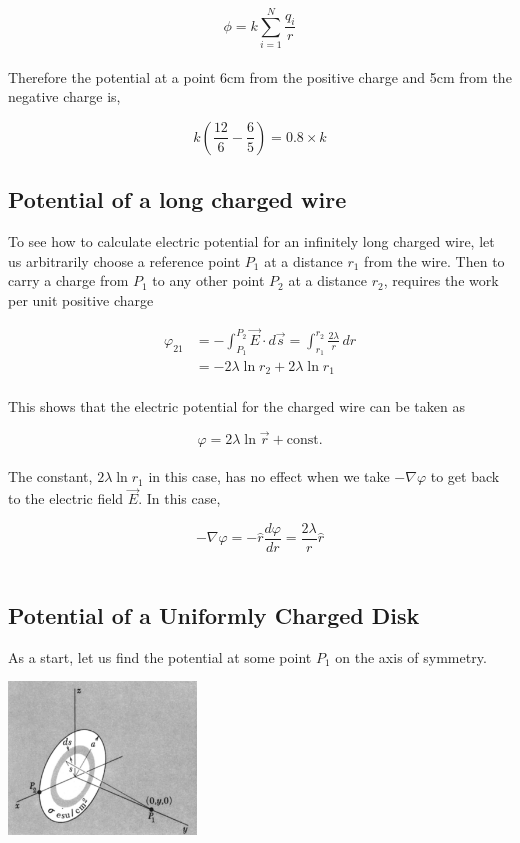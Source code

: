 \documentclass[svgnames]{article}
\begin{document}
\[ \phi = k\sum_{i=1}^N \frac{q_i}{r} \] \\

Therefore the potential at a point 6cm from the positive charge and 5cm from the negative charge is, 

\[
k (\frac{12}{6} - \frac{6}{5}) = 0.8 \times k
\]

\subsection{Potential of a long charged wire} 

To see how to calculate electric potential for an infinitely long charged wire, let us arbitrarily choose a reference point $P_1$ at a distance $r_1$ from the wire. Then to carry a charge from $P_1$ to any other point $P_2$ at a distance $r_2$, requires the work per unit positive charge 

\begin{align*} 
\varphi_{21} &= -\int_{P_1}^{P_2} \vec{E} \cdot d\vec{s} = \int_{r_1}^{r_2} \frac{2\lambda}{r} \, dr \\
&= -2 \lambda \ln r_2 + 2\lambda \ln r_1 
\end{align*} \\

This shows that the electric potential for the charged wire can be taken as 

\[ \varphi = 2\lambda \ln \vec{r} + \text{const.} \] \\

The constant, $2\lambda \ln r_1$ in this case, has no effect when we take $-\nabla \varphi$ to get back to the electric field $\vec{E}$. In this case, 

\[ -\nabla \varphi = -\hat{r} \frac{d \varphi}{dr} = \frac{2\lambda}{r} \hat{r} \] \\

\subsection{Potential of a Uniformly Charged Disk} 

As a start, let us find the potential at some point $P_1$ on the axis of symmetry. 

\begin{center}
\includegraphics[width = 50mm]{ss10.png}
\end{center} 
\end{document}
